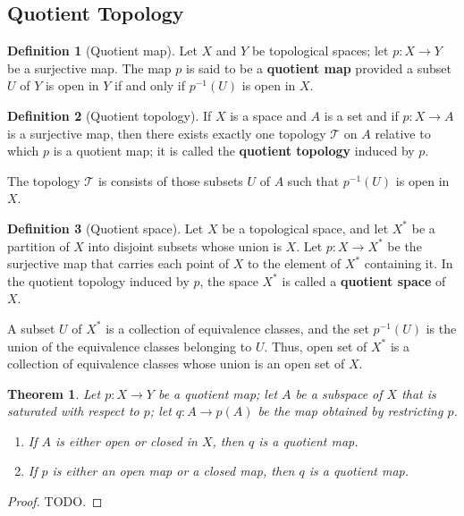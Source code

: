 \documentclass[12pt,reqno]{amsart}
\theoremstyle{plain}
\newtheorem{thm}{Theorem}
\theoremstyle{definition}
\newtheorem{defn}{Definition}
\newcommand{\cal}[1]{\mathcal{#1}}
\begin{document}
\subsection{Quotient Topology}
\begin{defn}[Quotient map]
    Let $X$ and $Y$ be topological spaces; let $p : X \to Y$ be a surjective map. The map $p$ is said to be a {\bf quotient map} provided a subset $U$ of $Y$ is open in $Y$ if and only if $p^{-1}(U)$ is open in $X$.
\end{defn}
\begin{defn}[Quotient topology]
    If $X$ is a space and $A$ is a set and if $p : X \to A$ is a surjective map, then there exists exactly one topology $\cal T$ on $A$ relative to which $p$ is a quotient map; it is called the {\bf quotient topology} induced by $p$.
\end{defn}

The topology $\cal T$ is consists of those subsets $U$ of $A$ such that $p^{-1}(U)$ is open in $X$.

\begin{defn}[Quotient space]
    Let $X$ be a topological space, and let $X^*$ be a partition of $X$ into disjoint subsets whose union is $X$. Let $p : X \to X^*$ be the surjective map that carries each point of $X$ to the element of $X^*$ containing it. In the quotient topology induced by $p$, the space $X^*$ is called a {\bf quotient space} of $X$.
\end{defn}
A subset $U$ of $X^*$ is a collection of equivalence classes, and the set $p^{-1}(U)$ is the union of the equivalence classes belonging to $U$. Thus, open set of $X^*$ is a collection of equivalence classes whose union is an open set of $X$.

\begin{thm}
    Let $p : X \to Y$ be a quotient map; let $A$ be a subspace of $X$ that is saturated with respect to $p$; let $q : A \to p(A)$ be the map obtained by restricting $p$.
    \begin{enumerate}
        \item If $A$ is either open or closed in $X$, then $q$ is a quotient map.
        \item If $p$ is either an open map or a closed map, then $q$ is a quotient map.
    \end{enumerate}
\end{thm}
\begin{proof}
    TODO.
\end{proof}
\end{document}
